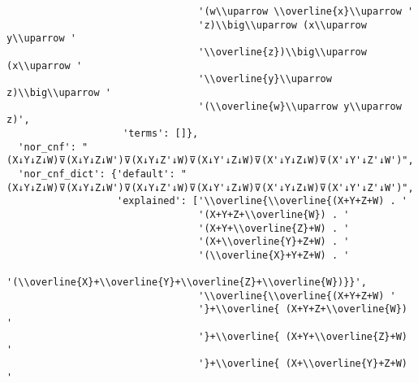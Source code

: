 \begin{verbatim}
                                 '(w\\uparrow \\overline{x}\\uparrow '
                                 'z)\\big\\uparrow (x\\uparrow y\\uparrow '
                                 '\\overline{z})\\big\\uparrow (x\\uparrow '
                                 '\\overline{y}\\uparrow z)\\big\\uparrow '
                                 '(\\overline{w}\\uparrow y\\uparrow z)',
                    'terms': []},
  'nor_cnf': "(X↓Y↓Z↓W)⊽(X↓Y↓Z↓W')⊽(X↓Y↓Z'↓W)⊽(X↓Y'↓Z↓W)⊽(X'↓Y↓Z↓W)⊽(X'↓Y'↓Z'↓W')",
  'nor_cnf_dict': {'default': "(X↓Y↓Z↓W)⊽(X↓Y↓Z↓W')⊽(X↓Y↓Z'↓W)⊽(X↓Y'↓Z↓W)⊽(X'↓Y↓Z↓W)⊽(X'↓Y'↓Z'↓W')",
                   'explained': ['\\overline{\\overline{(X+Y+Z+W) . '
                                 '(X+Y+Z+\\overline{W}) . '
                                 '(X+Y+\\overline{Z}+W) . '
                                 '(X+\\overline{Y}+Z+W) . '
                                 '(\\overline{X}+Y+Z+W) . '
                                 '(\\overline{X}+\\overline{Y}+\\overline{Z}+\\overline{W})}}',
                                 '\\overline{\\overline{(X+Y+Z+W) '
                                 '}+\\overline{ (X+Y+Z+\\overline{W}) '
                                 '}+\\overline{ (X+Y+\\overline{Z}+W) '
                                 '}+\\overline{ (X+\\overline{Y}+Z+W) '

\end{verbatim}
